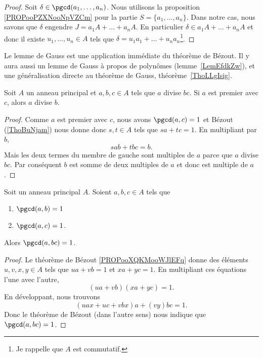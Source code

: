 \begin{proof}
	Soit \( \delta\in\pgcd(a_1,\ldots,a_n)\). Nous utilisons la proposition \ref{PROPooPZXNooNpVZCm} pour la partie \( S=\{ a_1,\ldots,a_n\}\). Dans notre cas, nous savons que \( \delta\) engendre \( J=a_1A+\ldots+a_nA\). En particulier \( \delta\in a_1A+\ldots+a_nA\) et donc il existe \( u_1,\ldots,u_n\in A\) tels que \( \delta=u_1a_1+\ldots+u_na_n\)\footnote{Je rappelle que \( A\) est commutatif.}.
\end{proof}

Le lemme de Gauss est une application immédiate du théorème de Bézout. Il y aura aussi un lemme de Gauss à propos de polynômes (lemme~\ref{LemEfdkZw}), et une généralisation directe au théorème de Gauss, théorème~\ref{ThoLLgIsig}.
\begin{lemma}    \label{LemSdnZNX}
	Soit \( A\) un anneau principal et \( a,b,c\in A\) tels que \( a\) divise \( bc\). Si \( a\) est premier avec \( c\), alors \( a\) divise \( b\).
\end{lemma}

\begin{proof}
	Comme \( a\) est premier avec \( c\), nous avons \( \pgcd(a,c)=1\) et Bézout (\ref{ThoBuNjam}) nous donne donc \( s,t\in A\) tels que \( sa+tc=1\). En multipliant par \( b\),
	\begin{equation}
		sab+tbc=b.
	\end{equation}
	Mais les deux termes du membre de gauche sont multiples de \( a\) parce que \( a\) divise \( bc\). Par conséquent \( b\) est somme de deux multiples de \( a\) et donc est multiple de \( a\).
\end{proof}

\begin{lemma}		\label{LEMooQJGIooEtVnyj}
	Soit un anneau principal \( A\). Soient \( a,b,c\in A\) tels que
	\begin{enumerate}
		\item
		      \( \pgcd(a,b)=1\)
		\item
		      \( \pgcd(a,c)=1\).
	\end{enumerate}
	Alors \( \pgcd(a,bc)=1\).
\end{lemma}

\begin{proof}
	Le théorème de Bézout \ref{PROPooXQKMooWJlEFq} donne des éléments \( u,v,x,y\in A\) tels que \( ua+vb=1\) et \( xa+yc=1\). En multipliant ces équations l'une avec l'autre,
	\begin{equation}
		(ua+vb)(xa+yc)=1.
	\end{equation}
	En développant, nous trouvons
	\begin{equation}
		(uax+uc+vbx)a+(vy)bc=1.
	\end{equation}
	Donc le théorème de Bézout (dans l'autre sens) nous indique que \( \pgcd(a,bc)=1\).
\end{proof}


